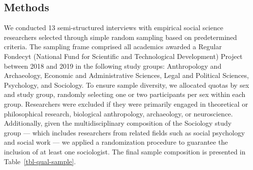 \documentclass[
  english,
  letterpaper,
]{article}
\begin{document}
\subsection{Methods}\label{methods}

We conducted 13 semi-structured interviews with empirical social science
researchers selected through simple random sampling based on
predetermined criteria. The sampling frame comprised all academics
awarded a Regular Fondecyt (National Fund for Scientific and
Technological Development) Project between 2018 and 2019 in the
following study groups: Anthropology and Archaeology, Economic and
Administrative Sciences, Legal and Political Sciences, Psychology, and
Sociology. To ensure sample diversity, we allocated quotas by sex and
study group, randomly selecting one or two participants per sex within
each group. Researchers were excluded if they were primarily engaged in
theoretical or philosophical research, biological anthropology,
archaeology, or neuroscience. Additionally, given the multidisciplinary
composition of the Sociology study group --- which includes researchers
from related fields such as social psychology and social work --- we
applied a randomization procedure to guarantee the inclusion of at least
one sociologist. The final sample composition is presented in
Table~\ref{tbl-qual-sample}.
\end{document}
